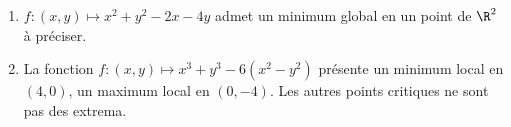 \documentclass[11pt]{article}
\begin{document}
\begin{ex}{}{}
    \begin{enumerate}[topsep=0pt,itemsep=-0.9 ex]
        \item $f:(x,y)\mapsto x^2+y^2-2x-4y$ admet un minimum global en un point de $\R^2$ à préciser.
        \item La fonction $f:(x,y)\mapsto x^3+y^3-6(x^2-y^2)$ présente un minimum local en $(4,0)$, un maximum local en $(0,-4)$. Les autres points critiques ne sont pas des extrema.
    \end{enumerate}
\end{ex}
\end{document}

